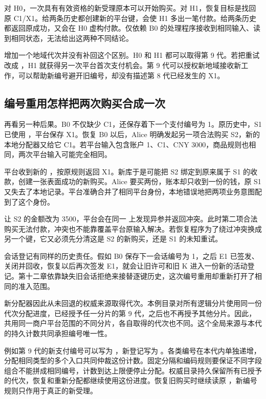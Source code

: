 对 H0，一次具有有效资格的新受理原本可以开始购买。对 H1，恢复目标是找回原 C1/X1。给两条历史都创建新的平台键，会使 H1 多出一笔付款。给两条历史都返回原成功，又会在 H0 虚构付款。仅依赖 B0 的处理程序接收到相同输入、读到相同状态，无法给出这两种不同结论。


增加一个地域代次并没有补回这个区别。H0 和 H1 都可以取得第 9 代。若把重试改成 ，H1 就获得另一次平台首次支付机会。第 9 代可以授权新地域接收新工作，可以帮助新编号避开旧编号，却没有描述第 8 代已经发生的 X1。

\subsection*{编号重用怎样把两次购买合成一次}

再看另一种后果。B0 不仅缺少 C1，还保存着下一个支付编号为 1。原历史中，S1 已使用 ，平台保存 X1。恢复 B0 以后，Alice 明确发起另一项合法购买 S2，新的本地分配器又给它 C1。若平台输入包含账户 1、C1、CNY 3000，商品规则也相同，两次平台输入可能完全相同。

平台收到新的 ，按原规则返回 X1。新库于是可能把 S2 绑定到原来属于 S1 的收款，创建一张表面成功的新购买。Alice 要买两份，账本却只收到一份的钱，原 S1 又失去了本地记录。平台准确合并了相同平台身份，本地错误地把两项业务意图配到了这个身份。

让 S2 的金额改为 3500，平台会在同一  上发现异参并返回冲突。此时第二项合法购买无法付款，冲突也不能靠覆盖平台原输入解决。若恢复程序为了绕过冲突换成另一个键，它又必须先分清这是 S2 的新购买，还是 S1 的未知重试。


会话登记有同样的历史责任。假如 B0 保存下一会话编号为 1，之后 E1 已签发、关闭并回收，恢复以后再次签发 E1，就会让旧许可和旧 K 进入一份新的活动登记。第十二章依靠缺失旧会话拒绝来接替逐键历史，这次编号重用却重新打开了相同的准入范围。

新分配器因此从未回退的权威来源取得代次。本例目录对所有逻辑分片使用同一份代次分配进度，已经授予任一分片的第 9 代，之后也不再授予其他分片。因此，共用同一商户平台范围的不同分片，各自取得的代次也不同。这个全局来源与本代的持久计数共同承担编号唯一性。

例如第 9 代的新支付编号可以写为 ，新登记写为 。各类编号在本代内单独递增，分配相同类型的多个入口共同仲裁这份计数。固定分隔和编码规则要保证不同字段组合不能拼成相同编号，计数到达上限便停止分配。权威目录持久保留所有已授予的代次，恢复和重新分配都继续使用这份进度。恢复旧购买时继续读原 ，新编号规则只作用于真正的新受理。

